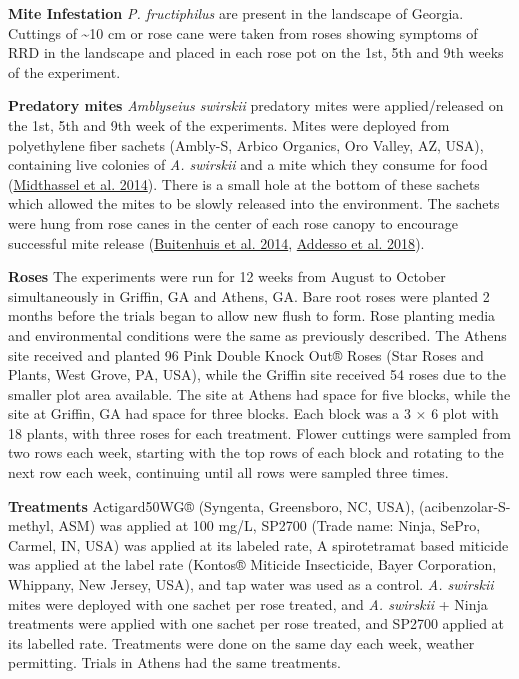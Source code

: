 \documentclass{ufdissertation}[overrideChapters] %
\begin{document}
{\textbf{Mite Infestation}
\emph{P. fructiphilus} are present in the landscape of Georgia. Cuttings of \textasciitilde10 cm or rose cane were taken from roses showing symptoms of RRD in the landscape and placed in each rose pot on the 1st, 5th and 9th weeks of the experiment.

\textbf{Predatory mites}
\emph{Amblyseius swirskii} predatory mites were applied/released on the 1st, 5th and 9th week of the experiments. Mites were deployed from polyethylene fiber sachets (Ambly-S, Arbico Organics, Oro Valley, AZ, USA), containing live colonies of \emph{A. swirskii} and a mite which they consume for food (\protect\hyperlink{ref-Midthassel2014}{Midthassel et al. 2014}). There is a small hole at the bottom of these sachets which allowed the mites to be slowly released into the environment. The sachets were hung from rose canes in the center of each rose canopy to encourage successful mite release (\protect\hyperlink{ref-Buitenhuis2014}{Buitenhuis et al. 2014}, \protect\hyperlink{ref-Addesso2018}{Addesso et al. 2018}).

\textbf{Roses}
The experiments were run for 12 weeks from August to October simultaneously in Griffin, GA and Athens, GA. Bare root roses were planted 2 months before the trials began to allow new flush to form. Rose planting media and environmental conditions were the same as previously described. The Athens site received and planted 96 Pink Double Knock Out® Roses (Star Roses and Plants, West Grove, PA, USA), while the Griffin site received 54 roses due to the smaller plot area available. The site at Athens had space for five blocks, while the site at Griffin, GA had space for three blocks. Each block was a 3 \(\times\) 6 plot with 18 plants, with three roses for each treatment. Flower cuttings were sampled from two rows each week, starting with the top rows of each block and rotating to the next row each week, continuing until all rows were sampled three times.

\textbf{Treatments}
Actigard50WG® (Syngenta, Greensboro, NC, USA), (acibenzolar-S-methyl, ASM) was applied at 100 \si{\milli\gram}/\si{\liter}, SP2700 (Trade name: Ninja\texttrademark, SePro, Carmel, IN, USA) was applied at its labeled rate, A spirotetramat based miticide was applied at the label rate (Kontos® Miticide Insecticide, Bayer Corporation, Whippany, New Jersey, USA), and tap water was used as a control. \emph{A. swirskii} mites were deployed with one sachet per rose treated, and \emph{A. swirskii} + Ninja treatments were applied with one sachet per rose treated, and SP2700 applied at its labelled rate. Treatments were done on the same day each week, weather permitting. Trials in Athens had the same treatments.

}
\end{document}
